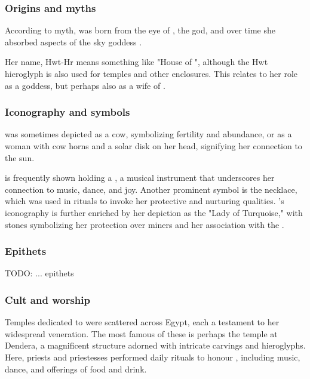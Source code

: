 \subsubsection*{Origins and myths}

According to myth,  was born from the eye of , the  god, and over time she absorbed aspects of the sky goddess .

Her name, Hwt-Hr means something like "House of ", although the Hwt hieroglyph is also used for temples and other enclosures. This relates to her role as a  goddess, but perhaps also as a wife of .

\subsubsection*{Iconography and symbols}

 was sometimes depicted as a cow, symbolizing fertility and abundance, or as a woman with cow horns and a solar disk on her head, signifying her connection to the sun.

 is frequently shown holding a , a musical instrument that underscores her connection to music, dance, and joy. Another prominent symbol is the  necklace, which was used in rituals to invoke her protective and nurturing qualities. 's iconography is further enriched by her depiction as the "Lady of Turquoise," with  stones symbolizing her protection over miners and her association with the .

\subsubsection*{Epithets}

TODO: ... epithets

\subsubsection*{Cult and worship}

Temples dedicated to  were scattered across Egypt, each a testament to her widespread veneration. The most famous of these is perhaps the temple at Dendera, a magnificent structure adorned with intricate carvings and hieroglyphs. Here, priests and priestesses performed daily rituals to honour , including music, dance, and offerings of food and drink.

